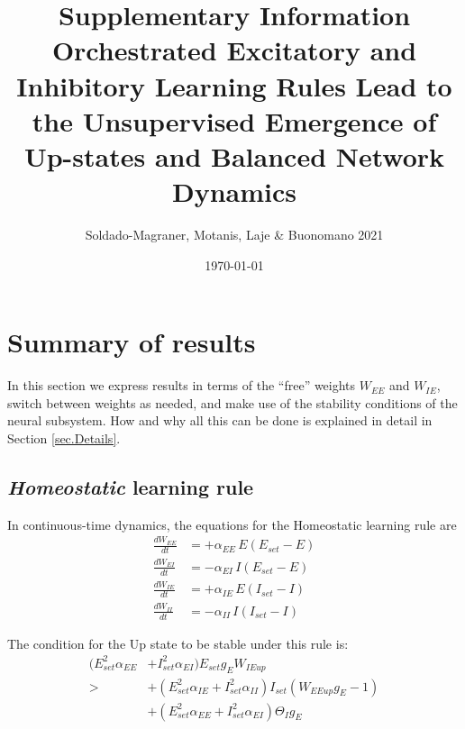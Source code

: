 \documentclass[twocolumn]{article}
\newcommand{\EE}{\mathit{EE}}
\newcommand{\EI}{\mathit{EI}}
\newcommand{\IE}{\mathit{IE}}
\newcommand{\II}{\mathit{II}}
\newcommand{\set}{\mathit{set}}
\newcommand{\up}{\mathit{up}}
\begin{document}
\title{\vspace{-2.0cm}Supplementary Information\\{\bf Orchestrated Excitatory and Inhibitory Learning Rules Lead to the Unsupervised Emergence of Up-states and Balanced Network Dynamics}}
\author{Soldado-Magraner, Motanis, Laje \& Buonomano 2021}
\date{\today}

\maketitle

\tableofcontents

\section{Summary of results}

In this section we express results in terms of the ``free'' weights $W_{\EE}$ and $W_{\IE}$, switch between weights as needed, and make use of the stability conditions of the neural subsystem. How and why all this can be done is explained in detail in Section \ref{sec.Details}.


\subsection{{\em Homeostatic} learning rule}

In continuous-time dynamics, the equations for the Homeostatic learning rule are
\begin{equation}
\begin{aligned}
\frac{dW_{\EE}}{dt} & = +\alpha_{\EE} \, E (E_{\set} - E) \\
\frac{dW_{\EI}}{dt} & = -\alpha_{\EI} \, I (E_{\set} - E) \\
\frac{dW_{\IE}}{dt} & = +\alpha_{\IE} \, E (I_{\set} - I) \\
\frac{dW_{\II}}{dt} & = -\alpha_{\II} \, I (I_{\set} - I)
\end{aligned}
\label{eq.SH_summary}
\end{equation}

\noindent The condition for the Up state to be stable under this rule is:
\begin{equation}
\begin{aligned}
(E_{\set}^2 \alpha_{\EE} & + I_{\set}^2 \alpha_{\EI}) E_{\set} g_E W_{\IE\up} \\
> & + (E_{\set}^2 \alpha_{\IE} + I_{\set}^2 \alpha_{\II}) I_{\set}(W_{\EE\up} g_E - 1) \\
& + (E_{\set}^2 \alpha_{\EE} + I_{\set}^2 \alpha_{\EI}) \Theta_I g_E
\end{aligned}
\label{eq.SH_stable_cond_v1_summary}
\end{equation}
\end{document}
